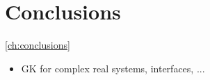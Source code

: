 \chapter{Conclusions}  \ref{ch:conclusions}

\begin{itemize}
    \item GK for complex real systems, interfaces, ...
\end{itemize}